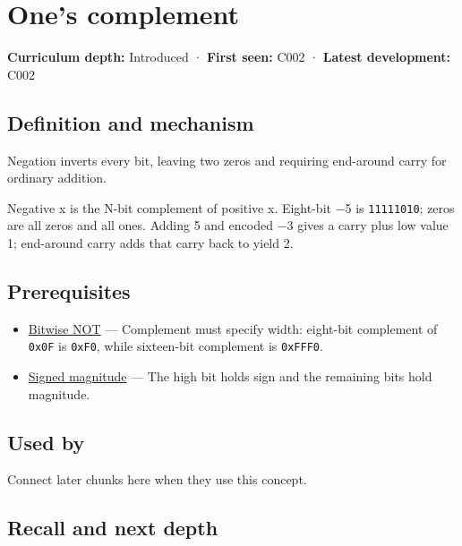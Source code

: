 \hypertarget{appendix-03c678cd40b3}{}\label{referencestart:appendix-03c678cd40b3}
\section{One's complement}\label{appendix-03c678cd40b3-ones-complement}

\textbf{Curriculum depth:} Introduced · \textbf{First seen:} C002 · \textbf{Latest development:} C002

\subsection{Definition and mechanism}\label{appendix-03c678cd40b3-definition-and-mechanism}

Negation inverts every bit, leaving two zeros and requiring end-around carry for ordinary addition.

Negative x is the N-bit complement of positive x. Eight-bit −5 is \texttt{11111010}; zeros are all zeros and all ones. Adding 5 and encoded −3 gives a carry plus low value 1; end-around carry adds that carry back to yield 2.

\subsection{Prerequisites}\label{appendix-03c678cd40b3-prerequisites}

\begin{itemize}
\tightlist
\item
  \hyperref[appendix-8f38927cfc54]{Bitwise NOT} --- Complement must specify width: eight-bit complement of \texttt{0x0F} is \texttt{0xF0}, while sixteen-bit complement is \texttt{0xFFF0}.
\item
  \hyperref[appendix-ce20506c8532]{Signed magnitude} --- The high bit holds sign and the remaining bits hold magnitude.
\end{itemize}

\subsection{Used by}\label{appendix-03c678cd40b3-used-by}

Connect later chunks here when they use this concept.

\subsection{Recall and next depth}\label{appendix-03c678cd40b3-recall-and-next-depth}

